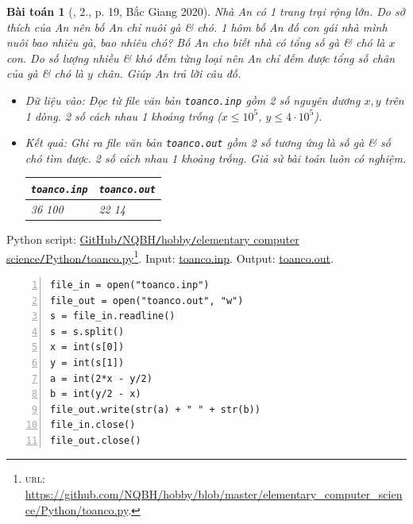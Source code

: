 \documentclass{article}
\newtheorem{baitoan}{Bài toán}
\begin{document}
\begin{baitoan}[\cite{VietSTEM2021}, 2., p. 19, Bắc Giang 2020]
	Nhà An có 1 trang trại rộng lớn. Do sở thích của An nên bố An chỉ nuôi gà \& chó. 1 hôm bố An đố con gái nhà mình nuôi bao nhiêu gà, bao nhiêu chó? Bố An cho biết nhà có tổng số gà \& chó là $x$ con. Do số lượng nhiều \& khó đếm từng loại nên An chỉ đếm được tổng số chân của gà \& chó là $y$ chân. Giúp An trả lời câu đố.
	\begin{itemize}
		\item {\sf Dữ liệu vào:} Đọc từ file văn bản \verb|toanco.inp| gồm 2 số nguyên dương $x,y$ trên 1 dòng. 2 số cách nhau 1 khoảng trống ($x\le10^5$, $y\le4\cdot10^5$).
		\item {\sf Kết quả:} Ghi ra file văn bản \verb|toanco.out| gồm 2 số tương ứng là số gà \& số chó tìm được. 2 số cách nhau 1 khoảng trống. Giả sử bài toán luôn có nghiệm.
		\begin{table}[H]
			\centering
			\begin{tabular}{|l|l|}
				\hline
				{\tt toanco.inp} & {\tt toanco.out} \\
				\hline
				36 100 & 22 14 \\
				\hline
			\end{tabular}
		\end{table}
	\end{itemize}
\end{baitoan}
Python script: \href{https://github.com/NQBH/hobby/blob/master/elementary_computer_science/Python/toanco.py}{GitHub{\tt /}NQBH{\tt /}hobby{\tt /}elementary computer science{\tt /}Python{\tt /}toanco.py}\footnote{\textsc{url}: \url{https://github.com/NQBH/hobby/blob/master/elementary_computer_science/Python/toanco.py}.}. Input: \href{https://github.com/NQBH/hobby/blob/master/elementary_computer_science/Python/toanco.inp}{toanco.inp}. Output: \href{https://github.com/NQBH/hobby/blob/master/elementary_computer_science/Python/toanco.out}{toanco.out}.
\begin{Verbatim}[numbers=left,xleftmargin=5mm]
file_in = open("toanco.inp")
file_out = open("toanco.out", "w")
s = file_in.readline()
s = s.split()
x = int(s[0])
y = int(s[1])
a = int(2*x - y/2)
b = int(y/2 - x)
file_out.write(str(a) + " " + str(b))
file_in.close()
file_out.close()
\end{Verbatim}
\end{document}
